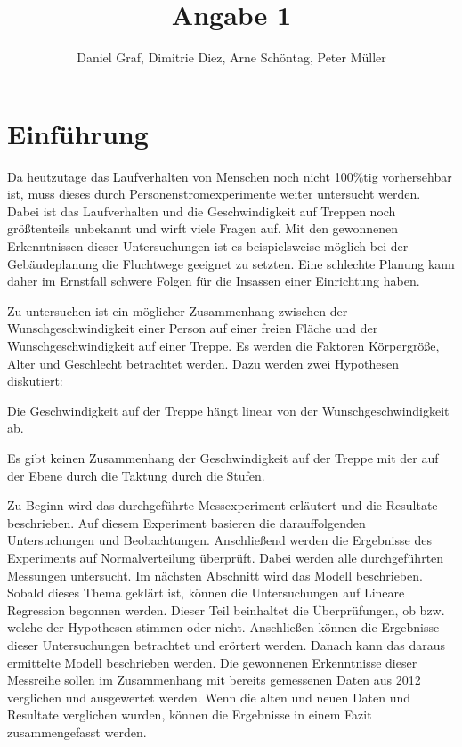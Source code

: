 
 
\title{Angabe 1}
\providecommand{\subtitle}[1]{}
\subtitle{Untertitel}
\author{Daniel Graf, Dimitrie Diez, Arne Schöntag, Peter Müller}
\date{}


\maketitle


\tableofcontents

\section{Einführung}
Da heutzutage das Laufverhalten von Menschen noch nicht 100\%tig vorhersehbar ist, muss dieses durch Personenstromexperimente weiter untersucht werden. Dabei ist das Laufverhalten und die Geschwindigkeit auf Treppen noch größtenteils unbekannt und wirft viele Fragen auf. Mit den gewonnenen Erkenntnissen dieser Untersuchungen ist es beispielsweise möglich bei der Gebäudeplanung die Fluchtwege geeignet zu setzten. Eine schlechte Planung kann daher im Ernstfall schwere Folgen für die Insassen einer Einrichtung haben.

Zu untersuchen ist ein möglicher Zusammenhang zwischen der Wunschgeschwindigkeit einer Person auf einer freien Fläche und der Wunschgeschwindigkeit auf einer Treppe. Es werden die Faktoren Körpergröße, Alter und Geschlecht betrachtet werden.
Dazu werden zwei Hypothesen diskutiert:
\begin{list}{-}{}
	\item Die Geschwindigkeit auf der Treppe hängt linear von der Wunschgeschwindigkeit ab.
	\item Es gibt keinen Zusammenhang der Geschwindigkeit auf der Treppe mit der auf der Ebene durch die Taktung durch die Stufen.
\end{list}
 
Zu Beginn wird das durchgeführte Messexperiment erläutert und die Resultate beschrieben. Auf diesem Experiment basieren die darauffolgenden Untersuchungen und Beobachtungen. Anschließend werden die Ergebnisse des Experiments auf Normalverteilung überprüft. Dabei werden alle durchgeführten Messungen untersucht. Im nächsten Abschnitt wird das Modell beschrieben. Sobald dieses Thema geklärt ist, können die Untersuchungen auf Lineare Regression begonnen werden. Dieser Teil beinhaltet die Überprüfungen, ob bzw. welche der Hypothesen stimmen oder nicht. Anschließen können die Ergebnisse dieser Untersuchungen betrachtet und erörtert werden.
Danach kann das daraus ermittelte Modell beschrieben werden.
Die gewonnenen Erkenntnisse dieser Messreihe sollen im Zusammenhang mit bereits gemessenen Daten aus 2012 verglichen und ausgewertet werden.
Wenn die alten und neuen Daten und Resultate verglichen wurden, können die Ergebnisse in einem Fazit zusammengefasst werden.

